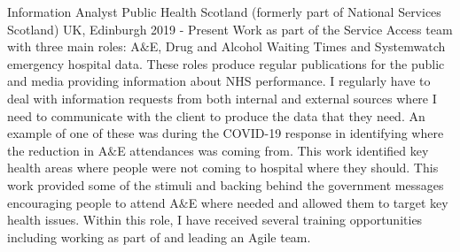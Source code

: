 \begin{cventries}

    
 \cventry
    {Information Analyst} %
    {Public Health Scotland (formerly part of National Services Scotland)} %
    {UK, Edinburgh} %
    {2019 - Present} %
    {
    Work as part of the Service Access team with three main roles: A$\&$E, Drug and Alcohol Waiting Times and Systemwatch emergency hospital data. These roles produce regular publications for the public and media providing information about NHS performance. I regularly have to deal with information requests from both internal and external sources where I need to communicate with the client to produce the data that they need. An example of one of these was during the COVID-19 response in identifying where the reduction in A$\&$E attendances was coming from. This work identified key health areas where people were not coming to hospital where they should. This work provided some of the stimuli and backing behind the government messages encouraging people to attend A$\&$E where needed and allowed them to target key health issues.\newline
    Within this role, I have received several training opportunities including working as part of and leading an Agile team.
    }
    


\end{cventries}
